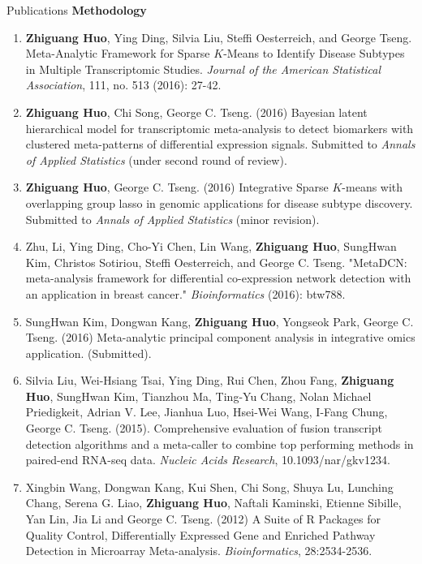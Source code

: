 \documentclass{resume} %
\begin{document}
\begin{rSection}{Publications}
\textbf{Methodology} 
\begin{enumerate}[noitemsep,topsep=0pt]
\item  {\bf Zhiguang Huo}, Ying Ding, Silvia Liu, Steffi Oesterreich, and George Tseng. Meta-Analytic Framework for Sparse $K$-Means to Identify Disease Subtypes in Multiple Transcriptomic Studies. \emph{Journal of the American Statistical Association},  111, no. 513 (2016): 27-42.
    \item {\bf Zhiguang Huo}, Chi Song, George C. Tseng. (2016)
Bayesian latent hierarchical model for transcriptomic meta-analysis to detect biomarkers with clustered meta-patterns of differential expression signals. Submitted to \emph{Annals of Applied Statistics} (under second round of review).
    \item {\bf Zhiguang Huo}, George C. Tseng. (2016)
    Integrative Sparse $K$-means with overlapping group lasso in genomic applications for disease subtype discovery.
Submitted to \emph{Annals of Applied Statistics} (minor revision).

\item Zhu, Li, Ying Ding, Cho-Yi Chen, Lin Wang, {\bf Zhiguang Huo}, SungHwan Kim, Christos Sotiriou, Steffi Oesterreich, and George C. Tseng. "MetaDCN: meta-analysis framework for differential co-expression network detection with an application in breast cancer." \emph{Bioinformatics} (2016): btw788.


\item SungHwan Kim, Dongwan Kang, {\bf Zhiguang Huo}, Yongseok
Park, George C. Tseng. (2016)
Meta-analytic principal component analysis in integrative omics application.
(Submitted).
    \item Silvia Liu, Wei-Hsiang Tsai, Ying Ding, Rui Chen, Zhou Fang, {\bf Zhiguang Huo}, SungHwan Kim, Tianzhou Ma, Ting-Yu Chang, Nolan Michael Priedigkeit, Adrian V. Lee, Jianhua Luo, Hsei-Wei Wang, I-Fang Chung, George C. Tseng. (2015).
Comprehensive evaluation of fusion transcript detection algorithms and a meta-caller to combine top performing methods in paired-end RNA-seq data.
\emph{Nucleic Acids Research}, 10.1093/nar/gkv1234.
    \item Xingbin Wang, Dongwan Kang, Kui Shen, Chi Song, Shuya Lu, Lunching Chang, Serena G. Liao, {\bf Zhiguang Huo}, Naftali Kaminski, Etienne Sibille, Yan Lin, Jia Li and George C. Tseng. (2012) A Suite of R Packages for Quality Control, Differentially Expressed Gene and Enriched Pathway Detection in Microarray Meta-analysis. \emph{Bioinformatics}, 28:2534-2536.
\end{enumerate}


\end{rSection}
\end{document}

